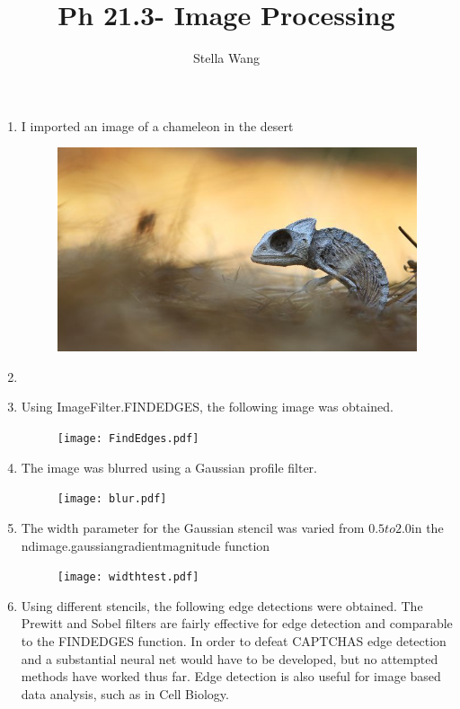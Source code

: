 \documentclass{article}
\title{Ph 21.3- Image Processing}
\author{Stella Wang}
\begin{document}
	\maketitle
\begin{enumerate}
	\item I imported an image of a chameleon in the desert 
	\begin{figure}[H]
	\includegraphics[width = \textwidth]{chameleon.jpeg}
	\end{figure}
	\item  
	\item Using ImageFilter.FINDEDGES, the following image was obtained. 
	\begin{figure}[H]
	\texttt{[image: FindEdges.pdf]}
	\end{figure}
	\item The image was blurred using a Gaussian profile filter. 
	\begin{figure}[H]
	\texttt{[image: blur.pdf]}
	\end{figure}
	\item The width parameter for the Gaussian stencil was varied from $ 0.5 to 2.0 $in the ndimage.gaussiangradientmagnitude function
	\begin{figure}[H]
	\texttt{[image: widthtest.pdf]}
	\end{figure}
	\item Using different stencils, the following edge detections were obtained. The Prewitt and Sobel filters are fairly effective for edge detection and comparable to the FINDEDGES function. In order to defeat CAPTCHAS edge detection and a substantial neural net would have to be developed, but no attempted methods have worked thus far. Edge detection is also useful for image based data analysis, such as in Cell Biology.
	\begin{figure}[H]

\end{figure}
\end{enumerate}
\end{document}
